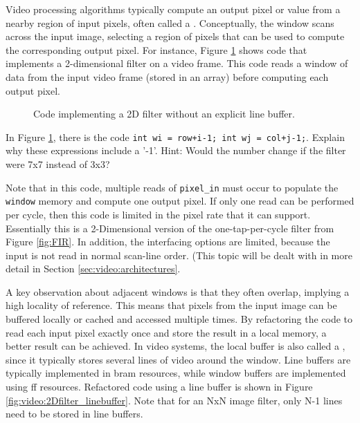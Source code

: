 Video processing algorithms typically compute an output pixel or value from a nearby region of input pixels, often called a .   Conceptually, the window scans across the input image, selecting a region of pixels that can be used to compute the corresponding output pixel.  For instance, Figure \ref{fig:video:2Dfilter} shows code that implements a 2-dimensional filter on a video frame.  This code reads a window of data from the input video frame (stored in an array) before computing each output pixel.  

\begin{figure}
{\tiny }
\caption{Code implementing a 2D filter without an explicit line buffer.} \label{fig:video:2Dfilter}
\end{figure}

\begin{exercise}
In Figure \ref{fig:video:2Dfilter}, there is the code \lstinline{int wi = row+i-1; int wj = col+j-1;}.  Explain why these expressions include a '-1'.  Hint: Would the number change if the filter were 7x7 instead of 3x3?
\end{exercise}

Note that in this code, multiple reads of \lstinline|pixel_in| must occur to populate the \lstinline|window| memory and compute one output pixel.  If only one read can be performed per cycle, then this code is limited in the pixel rate that it can support.  Essentially this is a 2-Dimensional version of the one-tap-per-cycle filter from Figure \ref{fig:FIR}.  In addition, the interfacing options are limited, because the input is not read in normal scan-line order.  (This topic will be dealt with in more detail in Section \ref{sec:video:architectures}.

A key observation about adjacent windows is that they often overlap, implying a high locality of reference.  This means that pixels from the input image can be buffered locally or cached and accessed multiple times.  By refactoring the code to read each input pixel exactly once and store the result in a local memory, a better result can be achieved.  In video systems, the local buffer is also called a , since it typically stores several lines of video around the window.   Line buffers are typically implemented in \gls{bram} resources, while window buffers are implemented using \gls{ff} resources.  Refactored code using a line buffer is shown in Figure \ref{fig:video:2Dfilter_linebuffer}.
Note that for an NxN image filter, only N-1 lines need to be stored in line buffers.  

